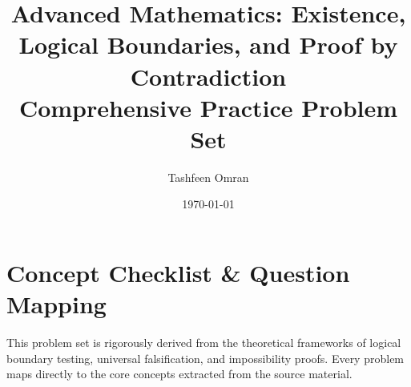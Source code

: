 \documentclass[11pt]{article}
\title{\textbf{Advanced Mathematics: Existence, Logical Boundaries, and Proof by Contradiction} \\ \Large Comprehensive Practice Problem Set}
\author{Tashfeen Omran}
\date{\today}
\theoremstyle{definition}
\begin{document}
\maketitle

\tableofcontents
\newpage

\section{Concept Checklist \& Question Mapping}
\label{sec:checklist_start}

This problem set is rigorously derived from the theoretical frameworks of logical boundary testing, universal falsification, and impossibility proofs. Every problem maps directly to the core concepts extracted from the source material.
\end{document}
